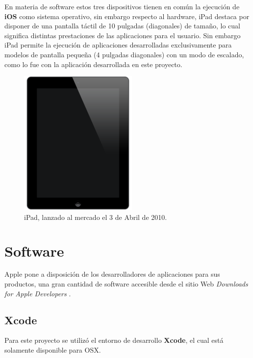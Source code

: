 En materia de software estos tres dispositivos tienen en común la ejecución de \textbf{iOS} como sistema operativo, sin embargo respecto al hardware, iPad destaca por disponer de una pantalla táctil de 10 pulgadas (diagonales) de tamaño, lo cual significa distintas prestaciones de las aplicaciones para el usuario. Sin embargo iPad permite la ejecución de aplicaciones desarrolladas exclusivamente para modelos de pantalla pequeña (4 pulgadas diagonales) con un modo de escalado, como lo fue con la aplicación desarrollada en este proyecto.

\begin{figure}[H]
	\centering
	\includegraphics[scale=0.4]{imgs/ipad-hw.png} 
	\caption{iPad, lanzado al mercado el 3 de Abril de 2010.}
	\label{img:ipad-hw}
\end{figure} 	 
		 
	\section{Software}
Apple pone a disposición de los desarrolladores de aplicaciones para sus productos, una gran cantidad de software accesible desde el sitio Web \textit{Downloads for Apple Developers} \cite{apple-repositorio}.
		\subsection{Xcode}
		\label{anexo:xcode}
		Para este proyecto se utilizó el entorno de desarrollo \textbf{Xcode}, el cual está solamente disponible para OSX.\\

